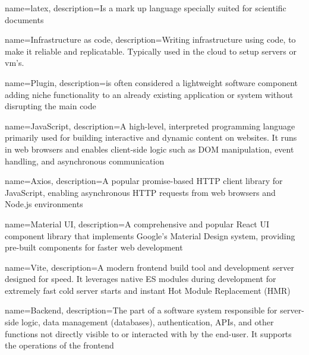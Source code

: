 

\makeglossaries %


{
        name=latex,
        description={Is a mark up language specially suited for
scientific documents}
}

{
    name=Infrastructure as code,
    description={Writing infrastructure using code, to make it reliable and replicatable. Typically used in the cloud to setup servers or vm's.}
}

{
    name=Plugin,
    description={is often considered a lightweight software component adding niche functionality to an already existing application or system without disrupting the main code}
}



{
    name=JavaScript,
    description={A high-level, interpreted programming language primarily used for building interactive and dynamic content on websites. It runs in web browsers and enables client-side logic such as DOM manipulation, event handling, and asynchronous communication}
}

{
    name=Axios,
    description={A popular promise-based HTTP client library for JavaScript, enabling asynchronous HTTP requests from web browsers and Node.js environments}
}

{
    name=Material UI,
    description={A comprehensive and popular React UI component library that implements Google's Material Design system, providing pre-built components for faster web development}
}

{
    name=Vite,
    description={A modern frontend build tool and development server designed for speed. It leverages native ES modules during development for extremely fast cold server starts and instant Hot Module Replacement (HMR)}
}

{
    name=Backend,
    description={The part of a software system responsible for server-side logic, data management (databases), authentication, APIs, and other functions not directly visible to or interacted with by the end-user. It supports the operations of the frontend}
}

